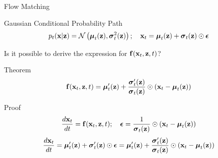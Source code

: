 \documentclass{beamer}
\begin{document}
\begin{frame}{Flow Matching}
	\begin{block}{Gaussian Conditional Probability Path}
		\vspace{-0.3cm}
		\[
			p_t(\mathbf{x} | \mathbf{z}) = \mathcal{N}\left(\boldsymbol{\mu}_t(\mathbf{z}), \boldsymbol{\sigma}_t^2(\mathbf{z})\right); \quad \mathbf{x}_t = \boldsymbol{\mu}_t(\mathbf{z}) + \boldsymbol{\sigma}_t(\mathbf{z}) \odot \boldsymbol{\epsilon}
		\]
		\vspace{-0.5cm}
	\end{block}
	Is it possible to derive the expression for $\mathbf{f}(\mathbf{x}_t, \mathbf{z}, t)$?
	\eqpause
	\begin{block}{Theorem}
		\vspace{-0.3cm}
		\[
			\mathbf{f}(\mathbf{x}_t, \mathbf{z}, t) =  \boldsymbol{\mu}_t'(\mathbf{z}) + \frac{\boldsymbol{\sigma}_t'(\mathbf{z})}{\boldsymbol{\sigma}_t(\mathbf{z})} \odot (\mathbf{x}_t - \boldsymbol{\mu}_t(\mathbf{z}))
		\]
		\vspace{-0.3cm}
	\end{block}
	\eqpause
	\vspace{-0.2cm}
	\begin{block}{Proof}
		\vspace{-0.2cm}
		\[
			\frac{d\mathbf{x}_t}{dt} = \mathbf{f}(\mathbf{x}_t, \mathbf{z}, t); \quad \boldsymbol{\epsilon} = \frac{1}{\boldsymbol{\sigma}_t(\mathbf{z})} \odot (\mathbf{x}_t - \boldsymbol{\mu}_t(\mathbf{z}))
		\]
		\eqpause
		\[
			\frac{d\mathbf{x}_t}{dt} = \boldsymbol{\mu}_t'(\mathbf{z}) + \boldsymbol{\sigma}_t'(\mathbf{z}) \odot \boldsymbol{\epsilon} =  \boldsymbol{\mu}_t'(\mathbf{z}) + \frac{\boldsymbol{\sigma}_t'(\mathbf{z})}{\boldsymbol{\sigma}_t(\mathbf{z})} \odot (\mathbf{x}_t - \boldsymbol{\mu}_t(\mathbf{z}))
		\]
	\end{block}
\end{frame}
\end{document}
